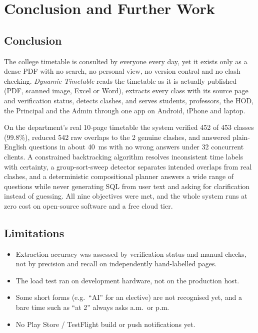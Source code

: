 \section{Conclusion and Further Work}

\subsection{Conclusion}
The college timetable is consulted by everyone every day, yet it exists only as a dense PDF with no
search, no personal view, no version control and no clash checking. \emph{Dynamic Timetable} reads the
timetable as it is actually published (PDF, scanned image, Excel or Word), extracts every class with its
source page and verification status, detects clashes, and serves students, professors, the HOD, the
Principal and the Admin through one app on Android, iPhone and laptop.

On the department's real 10-page timetable the system verified 452 of 453 classes (99.8\%), reduced
542 raw overlaps to the 2 genuine clashes, and answered plain-English questions in about 40~ms with
no wrong answers under 32 concurrent clients. A constrained backtracking algorithm resolves
inconsistent time labels with certainty, a group-sort-sweep detector separates intended overlaps
from real clashes, and a deterministic compositional planner answers a wide range of questions while
never generating SQL from user text and asking for clarification instead of guessing. All nine
objectives were met, and the whole system runs at zero cost on open-source software and a free cloud
tier.

\subsection{Limitations}
\begin{itemize}
\item Extraction accuracy was assessed by verification status and manual checks, not by precision and
      recall on independently hand-labelled pages.
\item The load test ran on development hardware, not on the production host.
\item Some short forms (e.g.\ ``AI'' for an elective) are not recognised yet, and a bare time such as
      ``at 2'' always asks a.m.\ or p.m.
\item No Play Store / TestFlight build or push notifications yet.
\end{itemize}

